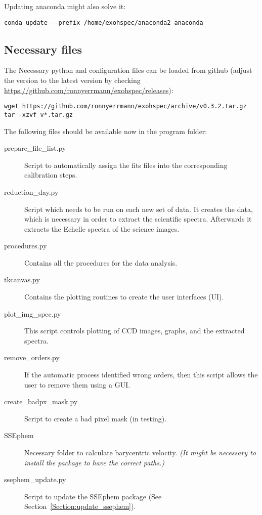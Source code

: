 \documentclass[10pt,a4paper]{article}
\begin{document}
Updating anaconda might also solve it:
\begin{lstlisting}[style=base]
conda update --prefix /home/exohspec/anaconda2 anaconda
\end{lstlisting}

\subsection{Necessary files}

\noindent The Necessary python and configuration files can be loaded from github (adjust the version to the latest version by checking \url{https://github.com/ronnyerrmann/exohspec/releases}):
\begin{lstlisting}[style=base]
wget https://github.com/ronnyerrmann/exohspec/archive/v0.3.2.tar.gz
tar -xzvf v*.tar.gz
\end{lstlisting}

\noindent The following files should be available now in the program folder:
\begin{description}
 \item[prepare\_file\_list.py] Script to automatically assign the fits files into the corresponding calibration steps.
 \item[reduction\_day.py] Script which needs to be run on each new set of data. It creates the data, which is necessary in order to extract the scientific spectra. Afterwards it extracts the Echelle spectra of the science images.
 \item[procedures.py] Contains all the procedures for the data analysis.
 \item[tkcanvas.py] Contains the plotting routines to create the user interfaces (UI).
 \item[plot\_img\_spec.py] This script controls plotting of CCD images, graphs, and the extracted spectra.
 \item[remove\_orders.py] If the automatic process identified wrong orders, then this script allows the user to remove them using a GUI.
 \item[create\_badpx\_mask.py] Script to create a bad pixel mask (in testing).
 \item[SSEphem] Necessary folder to calculate barycentric velocity. \textit{(It might be necessary to install the package to have the correct paths.)} 
 \item[ssephem\_update.py] Script to update the SSEphem package (See Section~\ref{Section:update_ssephem}).
\end{description}
\end{document}
